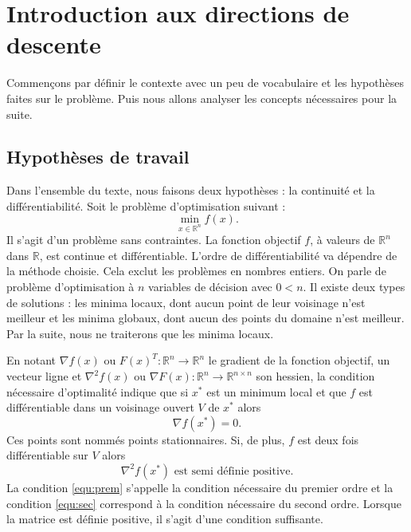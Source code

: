 

\section{Introduction aux directions de descente}
Commençons par d\'efinir le contexte avec un peu de vocabulaire et les hypoth\`eses faites sur le probl\`eme. Puis nous allons analyser
 les concepts n\'ecessaires pour la suite.
\subsection{Hypoth\`eses de travail}
Dans l'ensemble du texte, nous faisons deux hypoth\`eses : la continuit\'e et la diff\'erentiabilit\'e.
Soit le probl\`eme d'optimisation suivant :
\begin{equation}
\min_{x\in \mathbb{R}^n} f(x).
\label{eq:princ}
\end{equation}
Il s'agit d'un probl\`eme sans contraintes. La fonction objectif $f$, \`a valeurs de
 $\mathbb{R}^n$ dans $\mathbb{R}$, est continue et diff\'erentiable. L'ordre de diff\'erentiabilit\'e va d\'ependre de la m\'ethode choisie.
 Cela exclut les probl\`emes en nombres entiers. On parle de probl\`eme d'optimisation \`a $n$ variables de d\'ecision avec $0<n$.
Il existe deux types de solutions : les minima locaux, dont aucun point de leur voisinage n'est meilleur et les minima globaux, dont aucun des points
du domaine n'est meilleur. Par la suite, nous ne traiterons que les minima locaux.

En notant $\nabla f(x) $ ou $F(x)^T:\mathbb{R}^n\rightarrow \mathbb{R}^n$ le gradient de la fonction objectif, un vecteur ligne et
$ \nabla^2f(x)$ ou $\nabla F(x): \mathbb{R}^n\rightarrow \mathbb{R}^{n\times n} $ son hessien, la condition n\'ecessaire d'optimalit\'e
indique que si $x^*$ est un minimum local et que $f$ est diff\'erentiable dans un voisinage ouvert $V$ de $x^*$ alors
\begin{equation}
\label{equ:prem}
\nabla f(x^*)=0.
\end{equation}
Ces points sont nomm\'es points stationnaires.
Si, de plus, $f$ est deux fois diff\'erentiable sur $V$ alors
\begin{equation}
\label{equ:sec}
\nabla^2 f(x^*) \text{ est semi d\'efinie positive.}
\end{equation}
La condition \eqref{equ:prem} s'appelle la condition n\'ecessaire du premier ordre et la condition \eqref{equ:sec} correspond \`a la condition n\'ecessaire du second ordre.
Lorsque la matrice est d\'efinie positive, il s'agit d'une condition suffisante.



